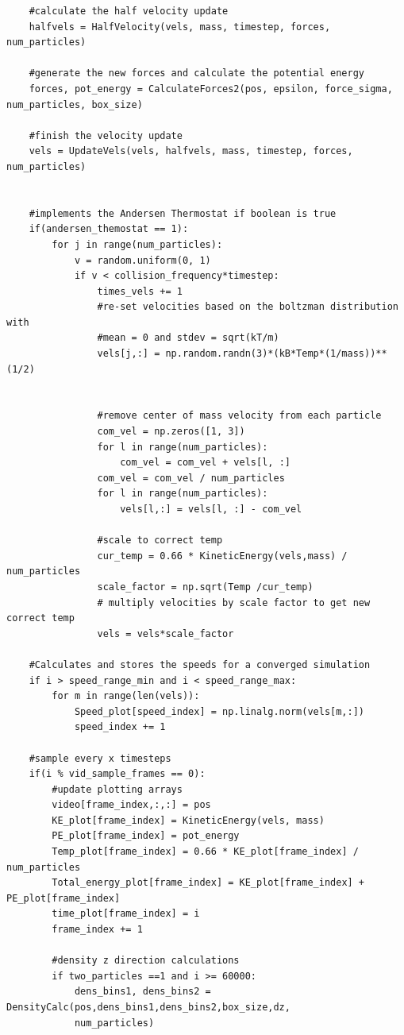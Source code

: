 \documentclass{article}
\begin{document}
\begin{lstlisting}
    #calculate the half velocity update
    halfvels = HalfVelocity(vels, mass, timestep, forces, num_particles)
    
    #generate the new forces and calculate the potential energy    
    forces, pot_energy = CalculateForces2(pos, epsilon, force_sigma, num_particles, box_size)

    #finish the velocity update
    vels = UpdateVels(vels, halfvels, mass, timestep, forces, num_particles)
    
    
    #implements the Andersen Thermostat if boolean is true
    if(andersen_themostat == 1):
        for j in range(num_particles):
            v = random.uniform(0, 1)
            if v < collision_frequency*timestep:
                times_vels += 1
                #re-set velocities based on the boltzman distribution with
                #mean = 0 and stdev = sqrt(kT/m)
                vels[j,:] = np.random.randn(3)*(kB*Temp*(1/mass))**(1/2)
                
                
                #remove center of mass velocity from each particle
                com_vel = np.zeros([1, 3])
                for l in range(num_particles):
                    com_vel = com_vel + vels[l, :]
                com_vel = com_vel / num_particles
                for l in range(num_particles):
                    vels[l,:] = vels[l, :] - com_vel
                
                #scale to correct temp
                cur_temp = 0.66 * KineticEnergy(vels,mass) / num_particles
                scale_factor = np.sqrt(Temp /cur_temp) 
                # multiply velocities by scale factor to get new correct temp
                vels = vels*scale_factor
                
    #Calculates and stores the speeds for a converged simulation
    if i > speed_range_min and i < speed_range_max:
        for m in range(len(vels)):
            Speed_plot[speed_index] = np.linalg.norm(vels[m,:])
            speed_index += 1
    
    #sample every x timesteps
    if(i % vid_sample_frames == 0):
        #update plotting arrays
        video[frame_index,:,:] = pos
        KE_plot[frame_index] = KineticEnergy(vels, mass)
        PE_plot[frame_index] = pot_energy
        Temp_plot[frame_index] = 0.66 * KE_plot[frame_index] / num_particles
        Total_energy_plot[frame_index] = KE_plot[frame_index] + PE_plot[frame_index]
        time_plot[frame_index] = i
        frame_index += 1
        
        #density z direction calculations
        if two_particles ==1 and i >= 60000:
            dens_bins1, dens_bins2 = DensityCalc(pos,dens_bins1,dens_bins2,box_size,dz,
            num_particles)
        

\end{lstlisting}
\end{document}
